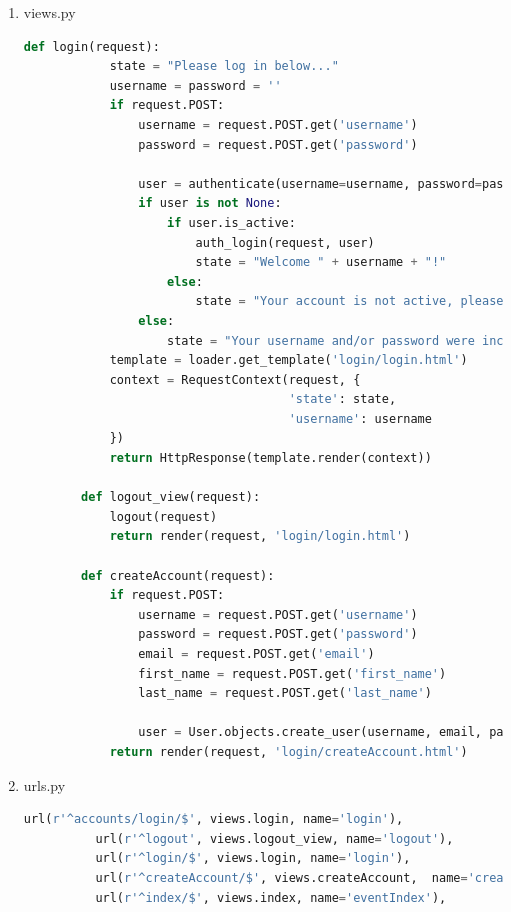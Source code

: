 \documentclass[letterpaper,10pt,onecolumn]{IEEEtran} %
\begin{document}
\begin{enumerate}
  \item views.py
    \begin{center}
      \begin{lstlisting}[language=Python]
        def login(request):
            state = "Please log in below..."
            username = password = ''
            if request.POST:
                username = request.POST.get('username')
                password = request.POST.get('password')

                user = authenticate(username=username, password=password)
                if user is not None:
                    if user.is_active:
                        auth_login(request, user)
                        state = "Welcome " + username + "!"
                    else:
                        state = "Your account is not active, please contact the site admin."
                else:
                    state = "Your username and/or password were incorrect."
            template = loader.get_template('login/login.html')
            context = RequestContext(request, {
                                     'state': state,
                                     'username': username
            })
            return HttpResponse(template.render(context))

        def logout_view(request):
            logout(request)
            return render(request, 'login/login.html')

        def createAccount(request):
            if request.POST:
                username = request.POST.get('username')
                password = request.POST.get('password')
                email = request.POST.get('email')
                first_name = request.POST.get('first_name')
                last_name = request.POST.get('last_name')

                user = User.objects.create_user(username, email, password)
            return render(request, 'login/createAccount.html')
      \end{lstlisting}
    \end{center}

  \item urls.py
    \begin{center}
      \begin{lstlisting}[language=Python]
          url(r'^accounts/login/$', views.login, name='login'),
          url(r'^logout', views.logout_view, name='logout'),
          url(r'^login/$', views.login, name='login'),
          url(r'^createAccount/$', views.createAccount,  name='createAccount'),
          url(r'^index/$', views.index, name='eventIndex'),

      \end{lstlisting}
    \end{center}

\end{enumerate}
\end{document}
